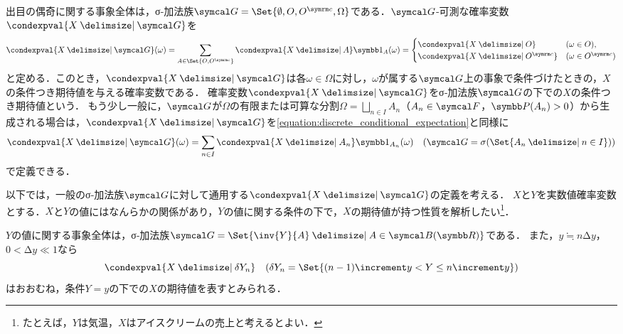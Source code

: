 \documentclass[../../main]{subfiles}
\begin{document}
出目の偶奇に関する事象全体は，σ‐加法族\(\sigmaalg{G}=\Set{\emptyset,O,\scomp{O},\Omega}\)である．\(\sigmaalg{G}\)‐可測な確率変数\(\condexpval{X\given\sigmaalg{G}}\)を
\begin{equation}
  \label{equation:discrete_conditional_expectation}
  \condexpval{X\given\sigmaalg{G}}(\omega) = \sum_{A\in\Set{O,\scomp{O}}}\condexpval{X\given A}\indicator_A(\omega)
  = \begin{cases}\condexpval{X\given O} & (\omega\in O),\\ \condexpval{X\given\scomp{O}} & (\omega\in\scomp{O})\end{cases}
\end{equation}
と定める．このとき，\(\condexpval{X\given\sigmaalg{G}}\)は各\(\omega\in\Omega\)に対し，\(\omega\)が属する\(\sigmaalg{G}\)上の事象で条件づけたときの，\(X\)の条件つき期待値を与える確率変数である．
確率変数\(\condexpval{X\given\sigmaalg{G}}\)をσ‐加法族\(\sigmaalg{G}\)の下での\(X\)の条件つき期待値という．
もう少し一般に，\(\sigmaalg{G}\)が\(\Omega\)の有限または可算な分割\(\Omega=\bigsqcup_{n\in I}A_n\)（\(A_n\in\sigmaalg{F}\)，\(\prob(A_n)>0\)）から生成される場合は，\(\condexpval{X\given\sigmaalg{G}}\)を\cref{equation:discrete_conditional_expectation}と同様に
\[
  \condexpval{X\given\sigmaalg{G}}(\omega) = \sum_{n\in I}\condexpval{X\given A_n}\indicator_{A_n}(\omega)\quad(\sigmaalg{G}=\sigmagen{\Set{A_n\given n\in I}})
\]
で定義できる．

以下では，一般のσ‐加法族\(\sigmaalg{G}\)に対して通用する\(\condexpval{X\given\sigmaalg{G}}\)の定義を考える．
\(X\)と\(Y\)を実数値確率変数とする．\(X\)と\(Y\)の値にはなんらかの関係があり，\(Y\)の値に関する条件の下で，\(X\)の期待値が持つ性質を解析したい\footnote{たとえば，\(Y\)は気温，\(X\)はアイスクリームの売上と考えるとよい．}．

\(Y\)の値に関する事象全体は，σ‐加法族\(\sigmaalg{G}=\Set{\inv{Y}{A}\given A\in\borelset{\numset{R}}}\)である．
また，\(y\fallingdotseq n\increment y\)，\(0<\increment y\ll 1\)なら
\[
  \condexpval{X\given\delta Y_n}\quad(\delta Y_n=\Set{(n-1)\increment y<Y\leq n\increment y})
\]
はおおむね，条件\(Y=y\)の下での\(X\)の期待値を表すとみられる．
\end{document}
